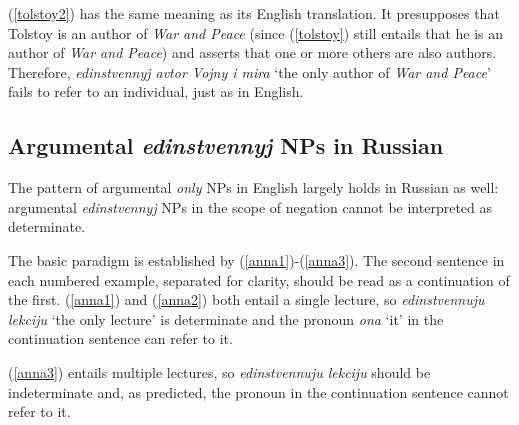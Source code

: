 (\ref{tolstoy2}) has the same meaning as its English translation. It presupposes that Tolstoy is an author of \textit{War and Peace} (since (\ref{tolstoy}) still entails that he is an author of \textit{War and Peace}) and asserts that one or more others are also authors. Therefore, \textit{edinstvennyj avtor Vojny i mira} `the only author of \textit{War and Peace}' fails to refer to an individual, just as in English.

\subsection{Argumental \textit{edinstvennyj} NPs in Russian}
The pattern of argumental \textit{only} NPs in English largely holds in Russian as well: argumental \textit{edinstvennyj} NPs in the scope of negation cannot be interpreted as determinate.

The basic paradigm is established by (\ref{anna1})-(\ref{anna3}). The second sentence in each numbered example, separated for clarity, should be read as a continuation of the first. (\ref{anna1}) and (\ref{anna2}) both entail a single lecture, so \textit{edinstvennuju lekciju} `the only lecture' is determinate and the pronoun \textit{ona} `it' in the continuation sentence can refer to it.

(\ref{anna3}) entails multiple lectures, so \textit{edinstvennuju lekciju} should be indeterminate and, as predicted, the pronoun in the continuation sentence cannot refer to it.

